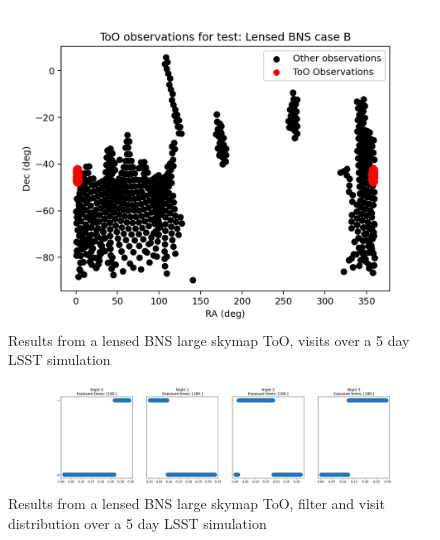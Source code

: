 \begin{figure}[h!]
    \centering
    \includegraphics[width=0.85\linewidth]{figures/validationTests/SVRequired/LensedBNSBPosition.png}
    \caption{Results from a lensed BNS large skymap ToO, visits over a 5 day LSST simulation}
    \label{fig:LensedBNSBPositionResult}
\end{figure}

\begin{figure}[h!]
    \centering
    \includegraphics[width=\linewidth]{figures/validationTests/SVRequired/LensedBNSBFilterPlot.png}
    \caption{Results from a lensed BNS large skymap ToO, filter and visit distribution over a 5 day LSST simulation}
    \label{fig:LensedBNSBFilterResult}
\end{figure}
\clearpage